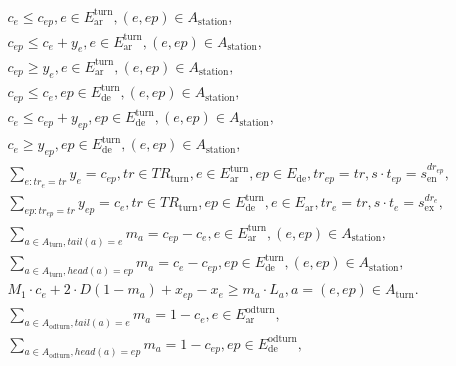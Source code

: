 \begin{align}
  &  & c_{e} \leq c_{ep} , e \in E_{\text{ar}}^{\text{turn}} , \left(e , ep\right) \in A_{\text{station}} ,  \tag{eq\_0035} \\
  &  & c_{ep} \leq c_{e} + y_{e} , e \in E_{\text{ar}}^{\text{turn}} , \left(e , ep\right) \in A_{\text{station}} ,  \tag{eq\_0036} \\
  &  & c_{ep} \geq y_{e} , e \in E_{\text{ar}}^{\text{turn}} , \left(e , ep\right) \in A_{\text{station}} ,  \tag{eq\_0037} \\
  &  & c_{ep} \leq c_{e} , ep \in E_{\text{de}}^{\text{turn}} , \left(e , ep\right) \in A_{\text{station}} ,  \tag{eq\_0038} \\
  &  & c_{e} \leq c_{ep} + y_{ep} , ep \in E_{\text{de}}^{\text{turn}} , \left(e , ep\right) \in A_{\text{station}} ,  \tag{eq\_0039} \\
  &  & c_{e} \geq y_{ep} , ep \in E_{\text{de}}^{\text{turn}} , \left(e , ep\right) \in A_{\text{station}} ,  \tag{eq\_0040} \\
  &  & \sum_{e : t r_{e} = t r} y_{e} = c_{ep} , t r \in \mathit{TR}_{\text{turn}} , e \in E_{\text{ar}}^{\text{turn}} , ep \in E_{\text{de}} , t r_{ep} = t r , s \cdot t_{ep} = s_{\text{en}}^{d r_{ep}} ,  \tag{eq\_0041} \\
  &  & \underset{ep : t r_{ep} = t r}{\sum} y_{ep} = c_{e} , t r \in \mathit{TR}_{\text{turn}} , ep \in E_{\text{de}}^{\text{turn}} , e \in E_{\text{ar}} , t r_{e} = t r , s \cdot t_{e} = s_{\text{ex}}^{d r_{e}} ,  \tag{eq\_0042} \\
  &  & \underset{a \in A_{\text{turn}} , \mathit{tail} \left(a\right) = e}{\sum} m_{a} = c_{ep} - c_{e} , e \in E_{\text{ar}}^{\text{turn}} , \left(e , ep\right) \in A_{\text{station}} ,  \tag{eq\_0043} \\
  &  & \underset{a \in A_{\text{turn}} , \mathit{head} \left(a\right) = ep}{\sum} m_{a} = c_{e} - c_{ep} , ep \in E_{\text{de}}^{\text{turn}} , \left(e , ep\right) \in A_{\text{station}} ,  \tag{eq\_0044} \\
  &  & M_{1} \cdot c_{e} + 2 \cdot D \left(1 - m_{a}\right) + x_{ep} - x_{e} \geq m_{a} \cdot L_{a} , a = \left(e , ep\right) \in A_{\text{turn}} .  \tag{eq\_0045} \\
  &  & \underset{a \in A_{\text{odturn}} , \mathit{tail} \left(a\right) = e}{\sum} m_{a} = 1 - c_{e} , e \in E_{\text{ar}}^{\text{odturn}} ,  \tag{eq\_0046} \\
  &  & \underset{a \in A_{\text{odturn}} , \mathit{head} \left(a\right) = ep}{\sum} m_{a} = 1 - c_{ep} , ep \in E_{\text{de}}^{\text{odturn}} ,  \tag{eq\_0047} \\

\end{align}

